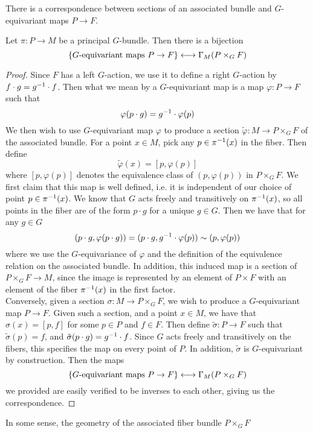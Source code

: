 %
There is a correspondence between sections of an associated bundle and
$G$-equivariant maps $P \to F$.
%
\begin{prop}
Let $\pi : P \to M$ be a principal $G$-bundle. Then there is a bijection
\[
\left\lbrace G\text{-equivariant maps } P \to F \right\rbrace \longleftrightarrow \Gamma_M(P \times_G F)
\]
\end{prop}
%
\begin{proof}
Since $F$ has a left $G$-action, we use it to define a right $G$-action
by $f \cdot g = g^{-1} \cdot f$. Then what we mean by a $G$-equivariant map is
a map $\varphi : P \to F$ such that
\[
\varphi(p\cdot g) = g^{-1}\cdot \varphi(p)
\]
We then wish to use $G$-equivariant map $\varphi$ to produce a section
$\tilde{\varphi} : M \to P \times_G F$ of the associated bundle. For a
point $x \in M$, pick any $p \in \pi^{-1}(x)$ in the fiber. Then define
\[
\tilde{\varphi}(x) = [p, \varphi(p)]
\]
where $[p, \varphi(p)]$ denotes the equivalence class of $(p, \varphi(p))$ in
$P \times_G F$. We first claim that this map is well defined, i.e. it is
independent of our choice of point $p \in \pi^{-1}(x)$. We know that $G$ acts
freely and transitively on $\pi^{-1}(x)$, so all points in the fiber are of
the form $p \cdot g$ for a unique $g \in G$. Then we have that for any $g \in G$
\[
(p\cdot g, \varphi(p \cdot g)) = (p \cdot g, g^{-1} \cdot \varphi(p)) \sim (p, \varphi(p))
\]
where we use the $G$-equivariance of $\varphi$ and the definition of the equivalence
relation on the associated bundle. In addition, this induced map is
a section of $P \times_G F \to M$, since the image is represented by an
element of $P \times F$ with an element of the fiber $\pi^{-1}(x)$ in the first
factor. \\

Conversely, given a section $\sigma : M \to P \times_G F$, we wish to produce
a $G$-equivariant map $P \to F$. Given such a section, and a point $x \in M$,
we have that $\sigma(x) = [p, f]$ for some $p \in P$ and $f \in F$. Then
define $\tilde{\sigma} : P \to F$ such that $\tilde{\sigma}(p) = f$, and
$\tilde{\sigma}(p \cdot g) = g^{-1} \cdot f$. Since $G$ acts freely and transitively
on the fibers, this specifies the map on every point of $P$. In addition,
$\tilde{\sigma}$ is $G$-equivariant by construction.
Then the maps
\[
\left\lbrace G\text{-equivariant maps } P \to F \right\rbrace \longleftrightarrow \Gamma_M(P \times_G F)
\]
we provided are easily verified to be inverses to each other, giving us the
correspondence.
\end{proof}
%
In some sense, the geometry of the associated fiber bundle $P \times_G F$
